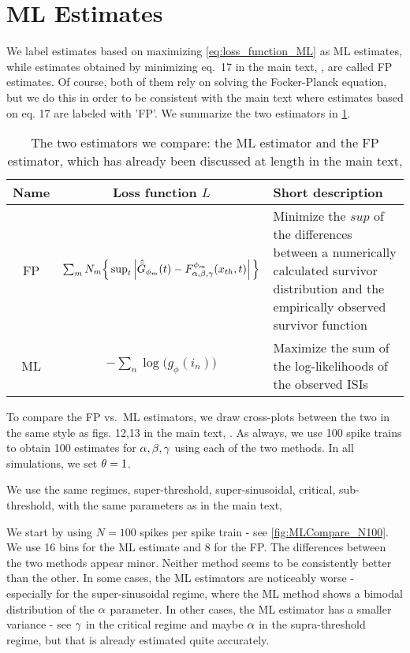 \documentclass{article}
\begin{document}
\section{ML Estimates}
We label estimates based on maximizing \cref{eq:loss_function_ML} as ML
estimates, while estimates obtained by minimizing eq.\ 17 in the main text, \cite{Iolov2013},
are called FP estimates. Of course, both of them rely on solving the
Focker-Planck equation, but we do this in order to be consistent with the main text
where estimates based on eq. 17 are labeled with 'FP'. We summarize the two
estimators in \cref{tab:estimators}. \begin{table} \begin{tabular}{ccp{4cm}}
Name & Loss function $L$ & Short description
\\
\hline FP &$\sum_{m} N_m \Big\{ \sup_{t} \left| { \hat{{ \bar{G} }} }_{\phi_m}(t) -
F^{\phi_m}_{{\alpha},{\beta},{\gamma }}({ x_{th} },
t) \right| \Big \}$ & Minimize the $sup$ of the  differences between a
numerically calculated survivor distribution and the empirically observed
survivor function
\\
ML & $-\sum_n  \log \Big( g_\phi(i_n)
 \Big)$
& Maximize the sum of the log-likelihoods of the observed ISIs
 		\\
\hline  \end{tabular} \caption{The two estimators we compare: the ML estimator
and  the FP estimator, which has already been discussed at length in the main text,
\cite{Iolov2013}} \label{tab:estimators} \end{table}


To compare the FP vs.\ ML estimators, we draw cross-plots between
the two in the same style as figs. 12,13 in the main text,
\cite{Iolov2013}. As always, we use 100 spike trains to obtain 100
estimates for ${{\alpha},{\beta},{\gamma } }$ using each of the two methods. In all simulations, we set
${\theta} = 1$.

We use the same regimes, super-threshold, super-sinusoidal, critical,
sub-threshold, with the same parameters as in the main text,

We start by using $N=100$ spikes per spike train - see
\cref{fig:MLCompare_N100}. We use 16 bins for the ML estimate and 8 for the FP.
The differences between the two methods appear minor. Neither method seems to be
consistently better than the other. In some cases, the ML estimators are
noticeably worse - especially for the super-sinusoidal regime, where the ML
method shows a bimodal distribution of the ${\alpha}$ parameter. In other cases, the
ML estimator has a smaller variance - see ${\gamma }$ in the critical regime and maybe
${\alpha}$ in the supra-threshold regime, but that is already estimated quite
accurately.
\end{document}
